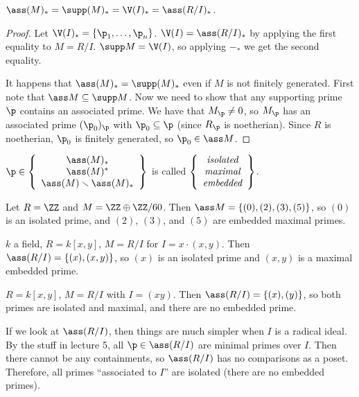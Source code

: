  \begin{theorem}
   $\ass (M)_* = \supp (M)_* = \V(I)_* = \ass (R/I)_*$.
 \end{theorem}
 \begin{proof}
   Let $\V(I)_*= \{\p_1,\dots, \p_n\}$. $\V(I)=\ass(R/I)_*$ by applying the first
   equality to $M=R/I$. $\supp M=\V(I)$, so applying $-_*$ we get the second equality.

   It happens that $\ass (M)_* = \supp (M)_*$ even if $M$ is not finitely generated.
   First note that $\ass M \subseteq \supp M$. Now we need to show that any supporting
   prime $\p$ contains an associated prime. We have that $M_\p\neq 0$, so $M_\p$ has an
   associated prime $(\p_0)_\p$ with $\p_0\subseteq \p$ (since $R_\p$ is noetherian).
   Since $R$ is noetherian, $\p_0$ is finitely generated, so $\p_0\in \ass M$.
 \end{proof}
 \setcounter{lecture}{11}

 \begin{definition}
   $\p\in \left\{\begin{array}{c}\ass (M)_* \\ \ass(M)^*\\ \ass (M)\smallsetminus
   \ass(M)_*\end{array} \right\}$ is called $\left\{\begin{array}{c}\emph{isolated}
   \\
   \emph{maximal}\\ \emph{embedded}\end{array} \right\}$.
 \end{definition}
 \begin{example}
   Let $R=\ZZ$ and $M=\ZZ\oplus \ZZ/60$. Then $\ass M = \{(0),(2),(3),(5)\}$, so $(0)$ is
   an isolated prime, and $(2)$, $(3)$, and $(5)$ are embedded maximal primes.
 \end{example}
 \begin{example}
   $k$ a field, $R=k[x,y]$, $M=R/I$ for $I=x\cdot (x,y)$. Then $\ass
   (R/I)=\{(x),(x,y)\}$, so $(x)$ is an isolated prime and $(x,y)$ is a maximal embedded
   prime.
 \end{example}
 \begin{example}
   $R=k[x,y]$, $M=R/I$ with $I=(xy)$. Then $\ass (R/I)=\{(x),(y)\}$, so both primes are
   isolated and maximal, and there are no embedded prime.
 \end{example}

 If we look at $\ass (R/I)$, then things are much simpler when $I$ is a radical ideal. By
 the stuff in lecture 5, all $\p\in \ass(R/I)$ are minimal primes over $I$. Then there
 cannot be any containments, so $\ass(R/I)$ has no comparisons as a poset. Therefore, all
 primes ``associated to $I$'' are isolated (there are no embedded primes).

